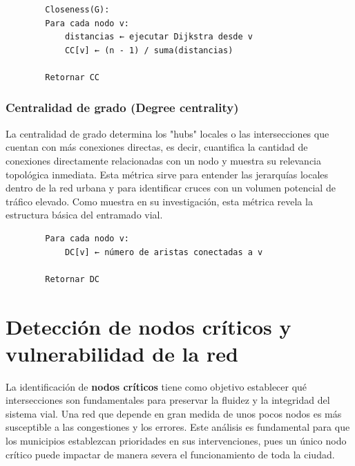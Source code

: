 \begin{listing}[H]
    \caption{Pseudocodigo del algoritmo cemtralidad de cercanía}
    \label{lst:closeness-centrality}
    \begin{verbatim}
        Closeness(G):
        Para cada nodo v:
            distancias ← ejecutar Dijkstra desde v
            CC[v] ← (n - 1) / suma(distancias)

        Retornar CC
    \end{verbatim}
\end{listing}

\subsubsection{Centralidad de grado (Degree centrality)}
La centralidad de grado determina los "hubs" locales o las intersecciones que cuentan con más conexiones directas, es decir, cuantifica la cantidad de conexiones 
directamente relacionadas con un nodo y muestra su relevancia topológica inmediata. Esta métrica sirve para entender las jerarquías locales dentro de la red urbana y 
para identificar cruces con un volumen potencial de tráfico elevado. Como \cite{porta_network_2004} muestra en su investigación, esta métrica revela la estructura básica del entramado vial.

\begin{listing}[H]
    \caption{Pseudocodigo del algoritmo de centralidad de grado}
    \label{lst:degree-centrality}
    \begin{verbatim}
        Para cada nodo v:
            DC[v] ← número de aristas conectadas a v

        Retornar DC
    \end{verbatim}
\end{listing}

\section{Detección de nodos críticos y vulnerabilidad de la red}
La identificación de \textbf{nodos críticos} tiene como objetivo establecer qué intersecciones son fundamentales para preservar la fluidez y la integridad del sistema vial. Una red que 
depende en gran medida de unos pocos nodos es más susceptible a las congestiones y los errores. Este análisis es fundamental para que los municipios establezcan prioridades en 
sus intervenciones, pues un único nodo crítico puede impactar de manera severa el funcionamiento de toda la ciudad.

